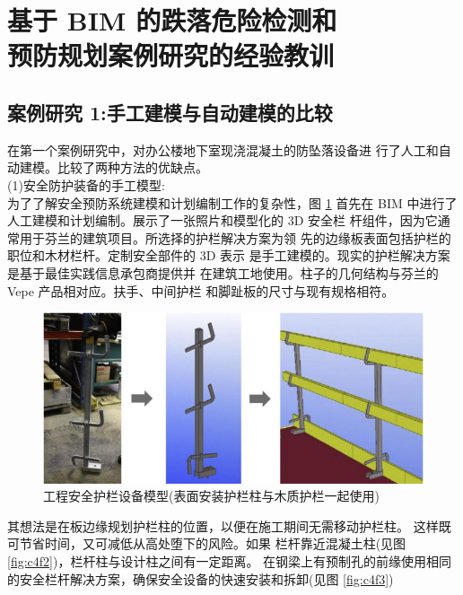 \section{基于 BIM 的跌落危险检测和\\预防规划案例研究的经验教训}
\subsection{案例研究 1:手工建模与自动建模的比较}

在第一个案例研究中，对办公楼地下室现浇混凝土的防坠落设备进
行了人工和自动建模。比较了两种方法的优缺点。\\

(1)安全防护装备的手工模型:\\

为了了解安全预防系统建模和计划编制工作的复杂性，图 \ref{fig:c4f1} 首先在 BIM
中进行了人工建模和计划编制。展示了一张照片和模型化的 3D 安全栏
杆组件，因为它通常用于芬兰的建筑项目。所选择的护栏解决方案为领
先的边缘板表面包括护栏的职位和木材栏杆。定制安全部件的 3D 表示
是手工建模的。现实的护栏解决方案是基于最佳实践信息承包商提供并
在建筑工地使用。柱子的几何结构与芬兰的 Vepe 产品相对应。扶手、中间护栏
和脚趾板的尺寸与现有规格相符。

\begin{figure}[thbp!]
    \centering
    \includegraphics[width=1.0\linewidth]{res/c4f1.png}
    \caption{工程安全护栏设备模型(表面安装护栏柱与木质护栏一起使用)}
    \label{fig:c4f1}
\end{figure}

其想法是在板边缘规划护栏柱的位置，以便在施工期间无需移动护栏柱。
这样既可节省时间，又可减低从高处堕下的风险。如果
栏杆靠近混凝土柱(见图 \ref{fig:c4f2})，栏杆柱与设计柱之间有一定距离。
在钢梁上有预制孔的前缘使用相同的安全栏杆解决方案，确保安全设备的快速安装和拆卸(见图 \ref{fig:c4f3})

